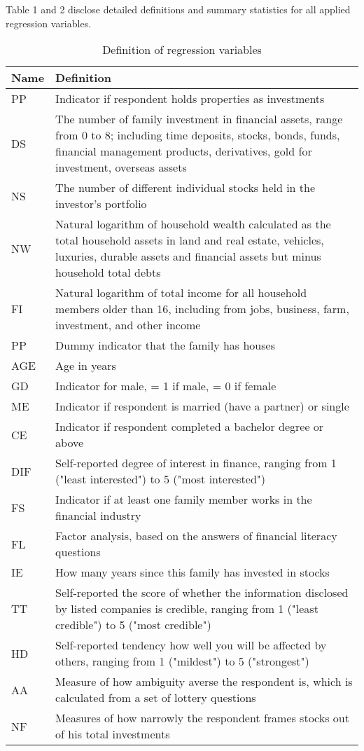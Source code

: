 \documentclass[ukenglish,nottitlepage,thmsb,11pt,letterpaper]{article}
\begin{document}
Table 1 and 2 disclose detailed definitions and summary statistics for all applied regression variables. 
 
 
 \begin{spacing}{1}
 	\begin{table}[H]
 		\renewcommand\arraystretch{1.25}%
 		\centering
 		\caption{Definition of regression variables}
 		\small
 		\begin{tabular}{L{2.25cm}L{13.25cm}}
 			\toprule
 			Name   & Definition \\
 			\midrule
 			PP & Indicator if respondent holds properties as investments  \\
 			DS   & The number of family investment in financial assets, range from 0 to 8; including time deposits, stocks, bonds, funds, financial management products, derivatives, gold for investment, overseas assets  \\ 
 			NS  & The number of different individual stocks held in the investor’s portfolio  \\
            \midrule
			NW   &   Natural logarithm of household wealth calculated as the total household assets in land and real estate, vehicles, luxuries, durable assets and financial assets but minus household total debts \\
			FI     & Natural logarithm of total income for all household members older than 16, including from jobs, business, farm, investment, and other income \\
 			PP    &  Dummy indicator that the family has houses  \\ 		
 			AGE       & Age in years \\
 			GD      & Indicator for male,  = 1 if male, = 0 if female  \\
 			ME   & Indicator if respondent is married (have a partner) or single  \\
 			CE & Indicator if respondent completed a bachelor degree or above \\
 			DIF & Self-reported degree of interest in finance, ranging from 1 ("least interested") to 5 ("most interested")\\
			
 		    FS  & Indicator if at least one family member works in the financial industry \\
 			FL  & Factor analysis, based on the answers of financial literacy questions \\
 			IE  &   How many years since this family has invested in stocks \\ 			
 			TT   & Self-reported the score of whether the information disclosed by listed companies is credible, ranging from 1 ("least credible") to 5 ("most credible") \\
 			HD   & Self-reported tendency how well you will be affected by others, ranging from 1 ("mildest") to 5 ("strongest") \\
 			AA  & Measure of how ambiguity  averse the respondent is, which is calculated from a set of lottery questions \\
 			NF &  Measures of how narrowly the respondent frames stocks out of his total investments \\


\end{tabular}
\end{table}
\end{spacing}
\end{document}
